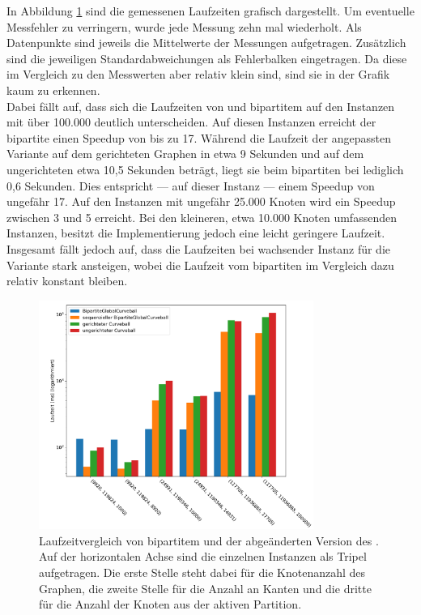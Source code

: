 In Abbildung \ref{fig:speedup_komplett} sind die gemessenen Laufzeiten grafisch dargestellt.
Um eventuelle Messfehler zu verringern, wurde jede Messung zehn mal 
wiederholt. Als Datenpunkte sind jeweils die Mittelwerte der Messungen aufgetragen.
Zusätzlich sind die jeweiligen Standardabweichungen als Fehlerbalken eingetragen. Da
diese im Vergleich zu den Messwerten aber relativ klein sind, sind sie in der Grafik kaum zu erkennen.
\\

Dabei fällt auf, dass sich die Laufzeiten von \cb{} und bipartitem \gc{} auf den
Instanzen mit über 100.000 deutlich unterscheiden. Auf diesen Instanzen erreicht
der bipartite \gc{} einen Speedup von bis zu 17. 
Während die Laufzeit der angepassten \cb{} Variante auf dem gerichteten Graphen in etwa 9 Sekunden
und auf dem ungerichteten etwa 10,5 Sekunden beträgt, liegt sie beim bipartiten \gc{} bei lediglich 
0,6 Sekunden. Dies entspricht --- auf dieser Instanz ---  einem Speedup von ungefähr 17.
Auf den Instanzen mit ungefähr 25.000 Knoten wird ein Speedup zwischen 3 und 5 erreicht.
Bei den kleineren, etwa 10.000 Knoten umfassenden Instanzen, besitzt die \cb{} Implementierung jedoch 
eine leicht geringere Laufzeit.
\\

Insgesamt fällt jedoch auf, dass die Laufzeiten bei wachsender Instanz für die \cb{}
Variante stark ansteigen, wobei die Laufzeit vom bipartiten \gc{} im Vergleich dazu
relativ konstant bleiben.
\begin{figure}
\centering
	\includegraphics[width = 0.8\textwidth]{figures/speedup.pdf}
	\caption{Laufzeitvergleich von bipartitem \gc{} und der abgeänderten Version des .{}
	Auf der horizontalen Achse sind die einzelnen Instanzen als Tripel aufgetragen.
Die erste Stelle steht dabei für die Knotenanzahl des Graphen, 
die zweite Stelle für die Anzahl an Kanten und die dritte für die Anzahl der Knoten aus 
der aktiven Partition.}
	\label{fig:speedup_komplett}
\end{figure}
